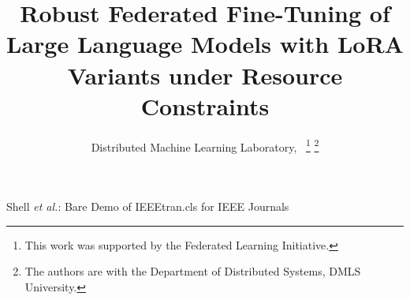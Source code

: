 




%
\title{Robust Federated Fine-Tuning of Large Language Models with LoRA Variants under Resource Constraints}

\author{Distributed Machine Learning Laboratory,~
\thanks{This work was supported by the Federated Learning Initiative.}
\thanks{The authors are with the Department of Distributed Systems, DMLS University.}
}
% 
%



%
{Shell \MakeLowercase{\textit{et al.}}: Bare Demo of IEEEtran.cls for IEEE Journals}
% 




